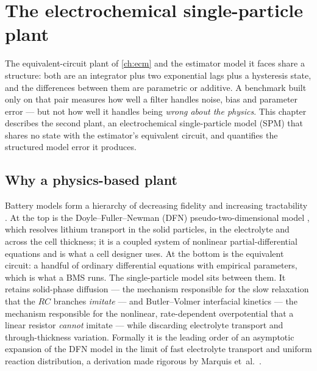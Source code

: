 \chapter{The electrochemical single-particle plant}
\label{ch:spm}

The equivalent-circuit plant of \cref{ch:ecm} and the estimator model it faces share a structure:
both are an integrator plus two exponential lags plus a hysteresis state, and the differences
between them are parametric or additive. A benchmark built only on that pair measures how well a
filter handles noise, bias and parameter error --- but not how well it handles being \emph{wrong
about the physics}. This chapter describes the second plant, an electrochemical single-particle
model (SPM) that shares no state with the estimator's equivalent circuit, and quantifies the
structured model error it produces.

\section{Why a physics-based plant}
\label{sec:spm-why}

Battery models form a hierarchy of decreasing fidelity and increasing tractability
\cite{brosaplanella2022continuum}. At the top is the Doyle--Fuller--Newman (DFN) pseudo-two-dimensional
model \cite{doyle1993modeling}, which resolves lithium transport in the solid particles, in the
electrolyte and across the cell thickness; it is a coupled system of nonlinear
partial-differential equations and is what a cell designer uses. At the bottom is the
equivalent circuit: a handful of ordinary differential equations with empirical parameters,
which is what a BMS runs. The single-particle model sits between them. It retains solid-phase
diffusion --- the mechanism responsible for the slow relaxation that the $RC$ branches
\emph{imitate} --- and Butler--Volmer interfacial kinetics --- the mechanism responsible for the
nonlinear, rate-dependent overpotential that a linear resistor \emph{cannot} imitate --- while
discarding electrolyte transport and through-thickness variation. Formally it is the leading
order of an asymptotic expansion of the DFN model in the limit of fast electrolyte transport and
uniform reaction distribution, a derivation made rigorous by Marquis
et~al.~\cite{marquis2019spme}.

